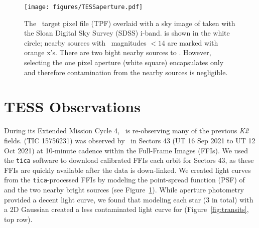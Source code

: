 \documentclass[twocolumn]{aastex631}
\begin{document}
\begin{figure}[!ht]
\begin{center}
\texttt{[image: figures/TESSaperture.pdf]}
\caption{The \tess\ target pixel file (TPF) overlaid with a sky image of \sname taken with the Sloan Digital Sky Survey (SDSS) i-band. \sname is shown in the white circle; nearby sources with \tess\ magnitudes $< 14$ are marked with orange x's. There are two bight nearby sources to \sname. However, selecting the one pixel aperture (white square) encapsulates only \sname and therefore contamination from the nearby sources is negligible.} \label{fig:tpf}
\end{center}
\end{figure}

\section{TESS Observations} \label{sec:observations}

During its Extended Mission Cycle 4, \tess\ is re-observing many of the previous \textit{K2} fields. \sname (TIC 15756231) was observed by \tess\ in Sectors 43 (UT 16 Sep 2021 to UT 12 Oct 2021) at 10-minute cadence within the Full-Frame Images (FFIs). We used the \texttt{tica} \citep{fausnaugh20} software to download calibrated FFIs each orbit for Sectors 43, as these FFIs are quickly available after the data is down-linked. We created light curves from the \texttt{tica}-processed FFIs by modeling the point-spread function (PSF) of \sname and the two nearby bright sources (see Figure~\ref{fig:tpf}). While aperture photometry provided a decent light curve, we found that modeling each star (3 in total) with a 2D Gaussian created a less contaminated light curve for \sname (Figure~\ref{fig:transits}, top row). 
\end{document}
